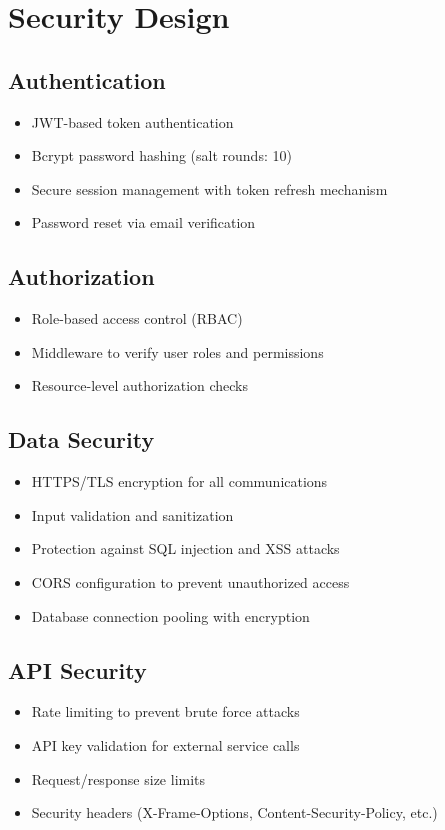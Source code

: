\section{Security Design}

\subsection{Authentication}
\begin{itemize}
    \item JWT-based token authentication
    \item Bcrypt password hashing (salt rounds: 10)
    \item Secure session management with token refresh mechanism
    \item Password reset via email verification
\end{itemize}

\subsection{Authorization}
\begin{itemize}
    \item Role-based access control (RBAC)
    \item Middleware to verify user roles and permissions
    \item Resource-level authorization checks
\end{itemize}

\subsection{Data Security}
\begin{itemize}
    \item HTTPS/TLS encryption for all communications
    \item Input validation and sanitization
    \item Protection against SQL injection and XSS attacks
    \item CORS configuration to prevent unauthorized access
    \item Database connection pooling with encryption
\end{itemize}

\subsection{API Security}
\begin{itemize}
    \item Rate limiting to prevent brute force attacks
    \item API key validation for external service calls
    \item Request/response size limits
    \item Security headers (X-Frame-Options, Content-Security-Policy, etc.)
\end{itemize}

